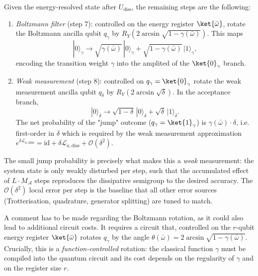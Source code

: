 Given the energy-resolved state after $U_\mathrm{diss}$, the remaining steps are the following:
\begin{enumerate}
    \item \emph{Boltzmann filter} (step 7): controlled on the energy register $\ket{\bar{\omega}}$, rotate the Boltzmann ancilla qubit $q_\gamma$ by $R_Y(2\arcsin\sqrt{1 - \gamma(\bar\omega)})$. This maps 
    $$|0\rangle_{\gamma} \to \sqrt{\gamma(\bar\omega)}\,|0\rangle_\gamma + \sqrt{1-\gamma(\bar\omega)}\,|1\rangle_\gamma,
    $$
    encoding the transition weight $\gamma$ into the amplited of the $\ket{0}_\gamma$ branch.
    \item \emph{Weak measurement} (step 8): controlled on $q_\gamma = \ket{0}_\gamma$ rotate the weak measurement ancilla qubit $q_\delta$ by $R_Y(2\arcsin\sqrt\delta)$. In the acceptance branch,
    $$
    |0\rangle_{\delta} \to \sqrt{1-\delta}\,|0\rangle_\delta + \sqrt\delta\,|1\rangle_\delta. 
    $$
    The net probability of the "jump" outcome ($q_\gamma = \ket{1}_\gamma$) is $\gamma(\bar{\omega}) \cdot \delta$, i.e. first-order in $\delta$ which is required by the weak measurement approximation $e^{\delta\mathcal{L}_{a,\mathrm{diss}}} = \mathrm{id} + \delta\mathcal{L}_{a,\mathrm{diss}} + \mathcal{O}(\delta^2)$. 
\end{enumerate}
The small jump probability is precisely what makes this a \emph{weak} measurement: the system state is only weakly disturbed per step, such that the accumulated effect of $L \cdot M_\mathcal{A}$ steps reproduces the dissipative semigroup to the desired accuracy.  The $\mathcal{O}(\delta^2)$ local error per step is the baseline that all other error sources (Trotterisation, quadrature, generator splitting) are tuned to match.

A comment has to be made regarding the Boltzmann rotation, as it could also lead to additional circuit costs. It requires a circuit that, controlled on the $r$-qubit energy register $\ket{\bar{\omega}}$ rotates $q_\gamma$ by the angle $\theta(\bar\omega) = 2\arcsin\sqrt{1 - \gamma(\bar\omega)}$. Crucially, this is a \emph{function-controlled} rotation: the classical function $\gamma$ must be compiled into the quantum circuit and its cost depends on the regularity of $\gamma$ and on the register size $r$.

